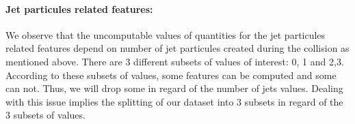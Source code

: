 \documentclass[twocolumn,10pt]{article}
\begin{document}
\paragraph*{Jet particules related features:}
We observe that the uncomputable values of quantities for the jet particules related features depend on number of jet particules created during the collision as mentioned above. There are 3 different subsets of values of interest: {0}, {1} and {2,3}. According to these subsets of values, some features can be computed and some can not. Thus, we will drop some in regard of the number of jets values. Dealing with this issue implies the splitting of our dataset into 3 subsets in regard of the 3 subsets of values. 
\end{document}
